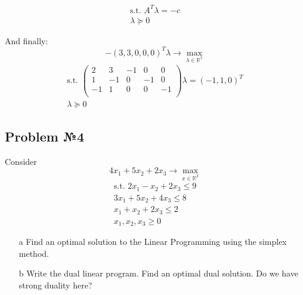 \begin{equation*}
\begin{gathered}
    \text{s.t. } A^T\lambda = - c \\
    \lambda \succcurlyeq 0
\end{gathered}
\end{equation*}

And finally:
\begin{equation*}
    -\left(3, 3, 0, 0, 0 \right)^T\lambda\rightarrow \max_{\lambda \in \mathds{R}^5}
\end{equation*}
\begin{equation*}
\begin{gathered}
    \text{s.t. } \begin{pmatrix}
    2  & 3  & -1 & 0  & 0  \\
    1  & -1 & 0  & -1 & 0  \\
    -1 & 1  & 0  & 0  & -1 \\
    \end{pmatrix} \lambda = (-1, 1, 0)^T \\
    \lambda \succcurlyeq 0
\end{gathered}
\end{equation*}

\subsection{Problem №4}
Consider
\begin{equation*}
    4x_1 + 5x_2 + 2x_3 \rightarrow \max_{x \in \mathds{R}^3}
\end{equation*}
\begin{equation*}
\begin{gathered}
    \text{s.t. } 2x_1 - x_2 + 2x_3 \leq 9 \\
    3x_1 + 5x_2 + 4x_3 \leq 8 \\
    x_1 + x_2 + 2x_3 \leq 2 \\
    x_1, x_2, x_3 \geq 0
\end{gathered}
\end{equation*}
\begin{enumerate}
    \item[a] Find an optimal solution to the Linear Programming using the simplex method.
    \item[b] Write the dual linear program. Find an optimal dual solution. Do we have strong duality here?
\end{enumerate}

